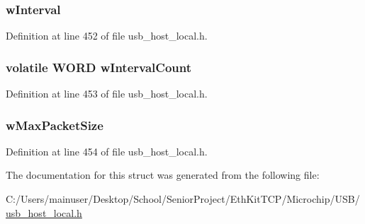 \subsubsection[{w\+Interval}]{ w\+Interval}\label{struct___u_s_b___e_n_d_p_o_i_n_t___i_n_f_o_a161d6c85ff13af7eff9055ee769187b2}


Definition at line 452 of file usb\+\_\+host\+\_\+local.\+h.

\hypertarget{struct___u_s_b___e_n_d_p_o_i_n_t___i_n_f_o_ac8f22e6455e88ff41868a6b43ca45f9d}{}
\subsubsection[{w\+Interval\+Count}]{\setlength{\rightskip}{0pt plus 5cm}volatile {\bf W\+O\+R\+D} w\+Interval\+Count}\label{struct___u_s_b___e_n_d_p_o_i_n_t___i_n_f_o_ac8f22e6455e88ff41868a6b43ca45f9d}


Definition at line 453 of file usb\+\_\+host\+\_\+local.\+h.

\hypertarget{struct___u_s_b___e_n_d_p_o_i_n_t___i_n_f_o_a77f1aab9a5262fe467eb67358cc171fc}{}
\subsubsection[{w\+Max\+Packet\+Size}]{ w\+Max\+Packet\+Size}\label{struct___u_s_b___e_n_d_p_o_i_n_t___i_n_f_o_a77f1aab9a5262fe467eb67358cc171fc}


Definition at line 454 of file usb\+\_\+host\+\_\+local.\+h.



The documentation for this struct was generated from the following file\+:\begin{DoxyCompactItemize}
\item 
C\+:/\+Users/mainuser/\+Desktop/\+School/\+Senior\+Project/\+Eth\+Kit\+T\+C\+P/\+Microchip/\+U\+S\+B/\hyperlink{usb__host__local_8h}{usb\+\_\+host\+\_\+local.\+h}\end{DoxyCompactItemize}
